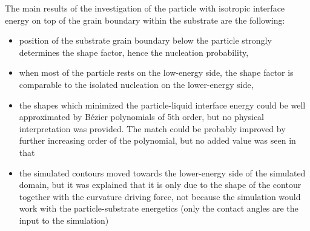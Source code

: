 The main results of the investigation of the particle with isotropic interface energy on top of the grain boundary within the substrate are the following:
\begin{itemize}
	\item position of the substrate grain boundary below the particle strongly determines the shape factor, hence the nucleation probability,
	\item when most of the particle rests on the low-energy side, the shape factor is comparable to the isolated nucleation on the lower-energy side,
	\item the shapes which minimized the particle-liquid interface energy could be well approximated by Bézier polynomials of 5th order, but no physical interpretation was provided. The match could be probably improved by further increasing order of the polynomial, but no added value was seen in that
	\item the simulated contours moved towards the lower-energy side of the simulated domain, but it was explained that it is only due to the shape of the contour together with the curvature driving force, not because the simulation would work with the particle-substrate energetics (only the contact angles are the input to the simulation)
\end{itemize}

\cleardoublepage

